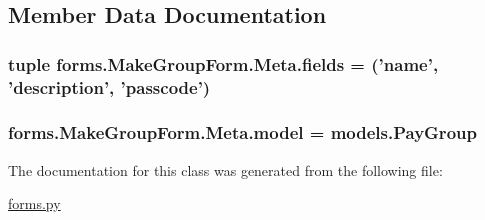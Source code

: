 \subsection{Member Data Documentation}
\hypertarget{classforms_1_1_make_group_form_1_1_meta_ae92fd41d182c3c9b6bb23221993839f5}{
\subsubsection[{fields}]{\setlength{\rightskip}{0pt plus 5cm}tuple forms.\-Make\-Group\-Form.\-Meta.\-fields = ('{\bf name}', '{\bf description}', '{\bf passcode}')\hspace{0.3cm}{\ttfamily [static]}}}\label{classforms_1_1_make_group_form_1_1_meta_ae92fd41d182c3c9b6bb23221993839f5}
\hypertarget{classforms_1_1_make_group_form_1_1_meta_ac29614b76d655e69c45c88b40a21c16e}{
\subsubsection[{model}]{\setlength{\rightskip}{0pt plus 5cm}forms.\-Make\-Group\-Form.\-Meta.\-model = {\bf models.\-Pay\-Group}\hspace{0.3cm}{\ttfamily [static]}}}\label{classforms_1_1_make_group_form_1_1_meta_ac29614b76d655e69c45c88b40a21c16e}


The documentation for this class was generated from the following file\-:\begin{DoxyCompactItemize}
\item 
\hyperlink{forms_8py}{forms.\-py}\end{DoxyCompactItemize}
